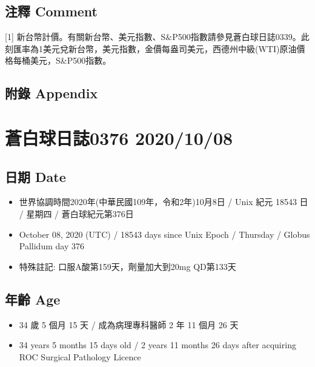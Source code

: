 \documentclass[
]{article}
\providecommand{\tightlist}{%
  \setlength{\itemsep}{0pt}\setlength{\parskip}{0pt}}
\begin{document}
\hypertarget{ux6ce8ux91cb-comment-34}{%
\subsection{注釋 Comment}\label{ux6ce8ux91cb-comment-34}}

{[}1{]}
新台幣計價。有關新台幣、美元指數、S\&P500指數請參見蒼白球日誌0339。此刻匯率為1美元兌新台幣，美元指數，金價每盎司美元，西德州中級(WTI)原油價格每桶美元，S\&P500指數。

\hypertarget{ux9644ux9304-appendix-34}{%
\subsection{附錄 Appendix}\label{ux9644ux9304-appendix-34}}

\hypertarget{ux84bcux767dux7403ux65e5ux8a8c0376-20201008}{%
\section{蒼白球日誌0376
2020/10/08}\label{ux84bcux767dux7403ux65e5ux8a8c0376-20201008}}

\hypertarget{ux65e5ux671f-date-35}{%
\subsection{日期 Date}\label{ux65e5ux671f-date-35}}

\begin{itemize}
\tightlist
\item
  世界協調時間2020年(中華民國109年，令和2年)10月8日 / Unix 紀元 18543 日
  / 星期四 / 蒼白球紀元第376日
\item
  October 08, 2020 (UTC) / 18543 days since Unix Epoch / Thursday /
  Globus Pallidum day 376
\item
  特殊註記: 口服A酸第159天，劑量加大到20mg QD第133天
\end{itemize}

\hypertarget{ux5e74ux9f61-age-35}{%
\subsection{年齡 Age}\label{ux5e74ux9f61-age-35}}

\begin{itemize}
\tightlist
\item
  34 歲 5 個月 15 天 / 成為病理專科醫師 2 年 11 個月 26 天
\item
  34 years 5 months 15 days old / 2 years 11 months 26 days after
  acquiring ROC Surgical Pathology Licence
\end{itemize}
\end{document}
